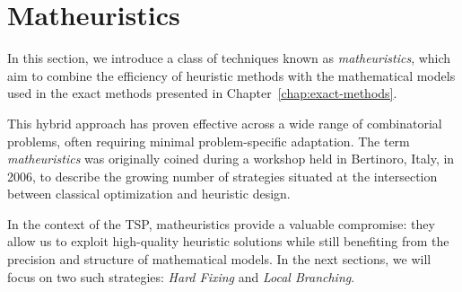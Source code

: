 \section{Matheuristics}

In this section, we introduce a class of techniques known as \emph{matheuristics}, which aim to combine the efficiency of heuristic methods with the mathematical models used in the exact methods presented in Chapter~\ref{chap:exact-methods}.

This hybrid approach has proven effective across a wide range of combinatorial problems, often requiring minimal problem-specific adaptation. The term \emph{matheuristics} was originally coined during a workshop held in Bertinoro, Italy, in 2006, to describe the growing number of strategies situated at the intersection between classical optimization and heuristic design.

In the context of the TSP, matheuristics provide a valuable compromise: they allow us to exploit high-quality heuristic solutions while still benefiting from the precision and structure of mathematical models. In the next sections, we will focus on two such strategies: \emph{Hard Fixing} and \emph{Local Branching}.
